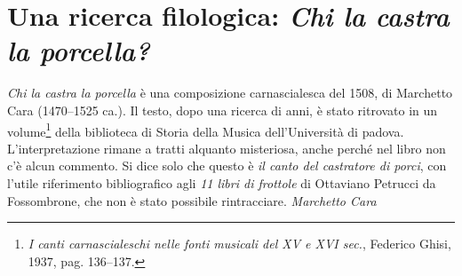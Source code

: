 \documentclass[italian,a4paper,10pt]{article}
\title{}
\date{}
\newenvironment{subt}{\vspace{-0.5\baselineskip}\small \centering \em}{\em \normalsize \\}
\begin{document}
\pagestyle{empty}
\section*{Una ricerca filologica: \emph{Chi la castra la porcella?}}
\emph{Chi la castra la porcella} è una composizione carnascialesca del 1508,
di Marchetto Cara (1470--1525 ca.). Il testo, dopo una ricerca di anni, è
stato ritrovato in un volume\footnote{\emph{I canti carnascialeschi nelle
fonti musicali del XV e XVI sec.}, Federico Ghisi, 1937, pag. 136--137.} della biblioteca di Storia della Musica
dell'Università di padova. L'interpretazione rimane a tratti alquanto
misteriosa, anche perch\'e nel libro non c'è alcun commento. Si dice solo
che questo è \emph{il canto del castratore di porci}, con l'utile
riferimento bibliografico agli \emph{11 libri di frottole} di Ottaviano
Petrucci da Fossombrone, che non è stato possibile rintracciare. 
\begin{subt}
Marchetto Cara
\end{subt}
\end{document}
